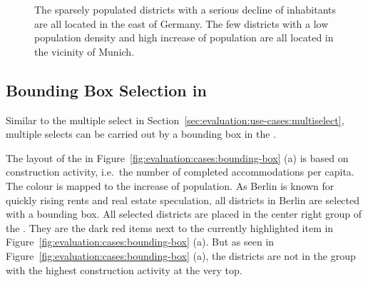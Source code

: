 \begin{figure}
  \centering
  \qquad
  \caption{
    The sparsely populated districts with a serious decline of inhabitants are all located in the east of Germany.
    The few districts with a low population density and high increase of population are all located in the vicinity of Munich.
  }\label{fig:evaluation:cases:multiselect:2}
\end{figure}

\subsection{Bounding Box Selection in \gv{}}\label{sec:evaluation:use-cases:bounding-box}
Similar to the multiple select in Section~\ref{sec:evaluation:use-cases:multiselect}, multiple selects can be carried out by a bounding box in the \gv{}.

The layout of the \tmap{} in Figure~\ref{fig:evaluation:cases:bounding-box} (a) is based on construction activity, i.e.\ the number of completed accommodations per capita.
The colour is mapped to the increase of population.
As Berlin is known for quickly rising rents and real estate speculation, all districts in Berlin are selected with a bounding box.
All selected districts are placed in the center right group of the \tmap{}.
They are the dark red items next to the currently highlighted item in Figure~\ref{fig:evaluation:cases:bounding-box} (a).
But as seen in Figure~\ref{fig:evaluation:cases:bounding-box} (a), the districts are not in the group with the highest construction activity at the very top.

